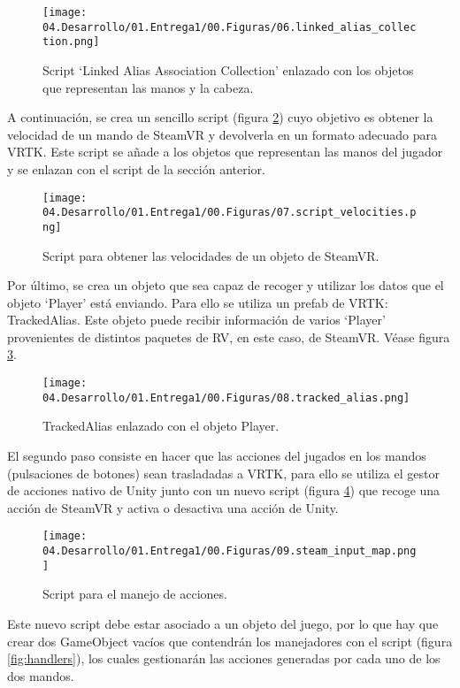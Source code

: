 \begin{figure}
  \centering
    \texttt{[image: 04.Desarrollo/01.Entrega1/00.Figuras/06.linked\_alias\_collection.png]}
    \caption{Script ‘Linked Alias Association Collection’ enlazado con los objetos que representan las manos y la cabeza.}
    \label{fig:linkedAliasAssociationCollection}
\end{figure}

A continuación, se crea un sencillo script (figura \ref{fig:scriptVelocities}) cuyo objetivo es obtener la velocidad de un mando de SteamVR y devolverla en un formato adecuado para VRTK. Este script se añade a los objetos que representan las manos del jugador y se enlazan con el script de la sección anterior.

\begin{figure}
  \centering
    \texttt{[image: 04.Desarrollo/01.Entrega1/00.Figuras/07.script\_velocities.png]}
    \caption{Script para obtener las velocidades de un objeto de SteamVR.}
    \label{fig:scriptVelocities}
\end{figure}

Por último, se crea un objeto que sea capaz de recoger y utilizar los datos que el objeto ‘Player’ está enviando. Para ello se utiliza un prefab de VRTK: TrackedAlias. Este objeto puede recibir información de varios ‘Player’ provenientes de distintos paquetes de RV, en este caso, de SteamVR. Véase figura \ref{fig:trackedAlias}.

\begin{figure}
  \centering
    \texttt{[image: 04.Desarrollo/01.Entrega1/00.Figuras/08.tracked\_alias.png]}
    \caption{TrackedAlias enlazado con el objeto Player.}
    \label{fig:trackedAlias}
\end{figure}


El segundo paso consiste en hacer que las acciones del jugados en los mandos (pulsaciones de botones) sean trasladadas a VRTK, para ello se utiliza el gestor de acciones nativo de Unity junto con un nuevo script (figura \ref{fig:scriptInput}) que recoge una acción de SteamVR y activa o desactiva una acción de Unity.

\begin{figure}
  \centering
    \texttt{[image: 04.Desarrollo/01.Entrega1/00.Figuras/09.steam\_input\_map.png]}
    \caption{Script para el manejo de acciones.}
    \label{fig:scriptInput}
\end{figure}

Este nuevo script debe estar asociado a un objeto del juego, por lo que hay que crear dos GameObject vacíos que contendrán los manejadores con el script (figura \ref{fig:handlers}), los cuales gestionarán las acciones generadas por cada uno de los dos mandos.

